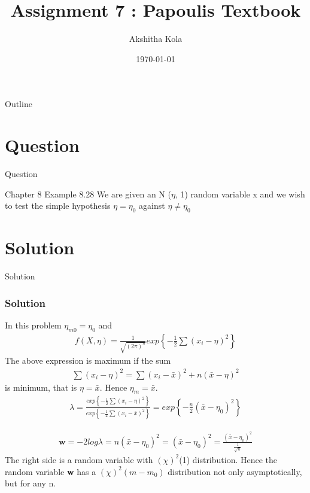 \documentclass{beamer}
\title{Assignment 7 : Papoulis Textbook }
\author{Akshitha Kola}
\date{\today}
\begin{document}
\begin{frame}
    \titlepage 
\end{frame}

\logo{}

\begin{frame}{Outline}
    \tableofcontents
\end{frame}

\section{Question}
\begin{frame}{Question}
    \begin{block}{Chapter 8 Example 8.28}
    We are given an N ($\eta$, 1) random variable x and we wish to test the simple hypothesis $\eta = \eta_{0}$ against $\eta \neq \eta_{0}$
    \end{block}
\end{frame}

\section{Solution}
\begin{frame}{Solution}
\frametitle{Solution}
In this problem $\eta_{m0} = \eta_{0}$ and 
\begin{align}
f(X,\eta) = \frac{1}{\sqrt{(2\pi)^{n}}}exp\left\lbrace -\frac{1}{2}\sum {(x_{i} - \eta)^{2}}\right\rbrace
\end{align}
The above expression is maximum if the sum 
\begin{align}
\sum {(x_{i} - \eta)^{2}} = \sum {(x_{i} - \bar{x})^{2}} + n(\bar{x} - \eta)^{2}
\end{align}
is minimum, that is $\eta = \bar{x}$. Hence $\eta_{m} = \bar{x}$.
\begin{align}
\lambda = \frac{exp\left\lbrace -\frac{1}{2}\sum {(x_{i} - \eta)^{2}}\right\rbrace}{exp\left\lbrace -\frac{1}{2}\sum {(x_{i} - \bar{x})^{2}}\right\rbrace} = exp\left\lbrace -\frac{n}{2}(\bar{x} - \eta_{0})^{2}\right\rbrace
\end{align}
\end{frame}

\begin{frame}
\begin{align}
 \textbf{w} = -2log\lambda = n(\bar{x} - \eta_{0})^{2} = (\bar{x} - \eta_{0})^{2} = \frac{(\bar{x} - \eta_{0})^{2}}{\frac{1}{\sqrt{n}}}
 \end{align}
 The right side is a random variable with $(\chi)^{2}$(1) distribution. Hence the random variable 
\textbf{w} has a $(\chi)^{2}(m - m_{0})$ distribution not only asymptotically, but for any n. 
\end{frame}
\end{document}
